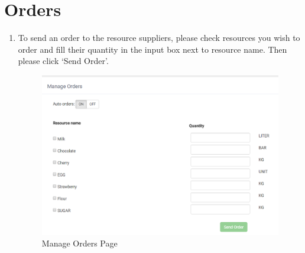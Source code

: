 \documentclass[a4paper,11pt,twoside]{report}
\theoremstyle{definition}
\begin{document}
\section{Orders}
\begin{enumerate}
\item To send an order to the resource suppliers, please check resources you wish to order and fill their quantity in the input box next to resource name.
Then please click ‘Send Order’.

\begin{figure}[h!]
\begin{center}
\includegraphics[width=\textwidth]{AS/orders/1}
\end{center}
\caption{Manage Orders Page}
\end{figure}
\thispagestyle{empty}

\end{enumerate}
\end{document}
